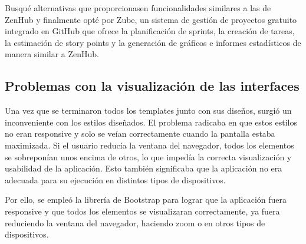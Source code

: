 Busqué alternativas que proporcionasen funcionalidades similares a las de ZenHub y finalmente opté por Zube, un sistema de gestión de proyectos gratuito integrado en GitHub que ofrece la planificación de sprints, la creación de tareas, la estimación de story points y la generación de gráficos e informes estadísticos de manera similar a ZenHub.


\subsection{Problemas con la visualización de las interfaces}
Una vez que se terminaron todos los templates junto con sus diseños, surgió un inconveniente con los estilos diseñados. El problema radicaba en que estos estilos no eran responsive y solo se veían correctamente cuando la pantalla estaba maximizada. Si el usuario reducía la ventana del navegador, todos los elementos se sobreponían unos encima de otros, lo que impedía la correcta visualización y usabilidad de la aplicación. Esto también significaba que la aplicación no era adecuada para su ejecución en distintos tipos de dispositivos.

Por ello, se empleó la librería de Bootstrap para lograr que la aplicación fuera responsive y que todos los elementos se visualizaran correctamente, ya fuera reduciendo la ventana del navegador, haciendo zoom o en otros tipos de dispositivos.
